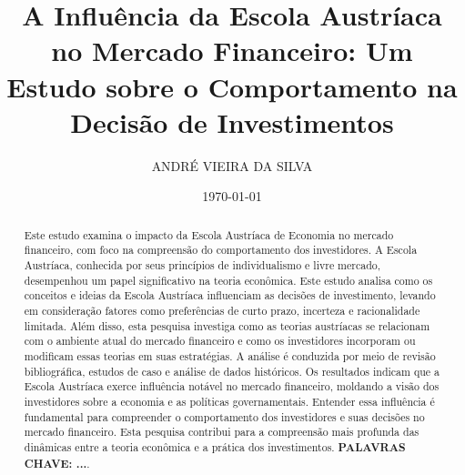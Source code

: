 \documentclass[a4paper,12pt]{article}
\title{\large \textbf{A Influência da Escola Austríaca no Mercado Financeiro: 
Um Estudo sobre o Comportamento na Decisão de Investimentos}}
\author{ANDRÉ VIEIRA DA SILVA}
\date{\today}
\begin{document}
\maketitle


\begin{abstract}
Este estudo examina o impacto da Escola Austríaca de Economia no mercado financeiro,
com foco na compreensão do comportamento dos investidores. A Escola Austríaca, 
conhecida por seus princípios de individualismo e livre mercado, desempenhou um papel 
significativo na teoria econômica. Este estudo analisa como os conceitos e ideias da 
Escola Austríaca influenciam as decisões de investimento, levando em consideração 
fatores como preferências de curto prazo, incerteza e racionalidade limitada. 
Além disso, esta pesquisa investiga como as teorias austríacas se relacionam com o 
ambiente atual do mercado financeiro e como os investidores incorporam ou modificam 
essas teorias em suas estratégias. A análise é conduzida por meio de revisão bibliográfica, 
estudos de caso e análise de dados históricos. Os resultados indicam que a Escola Austríaca 
exerce influência notável no mercado financeiro, moldando a visão dos investidores sobre a 
economia e as políticas governamentais. Entender essa influência é fundamental para 
compreender o comportamento dos investidores e suas decisões no mercado financeiro. Esta pesquisa 
contribui para a compreensão mais profunda das dinâmicas entre a teoria econômica e 
a prática dos investimentos.
\textbf{PALAVRAS CHAVE: ...}.
\end{abstract}
\end{document}
